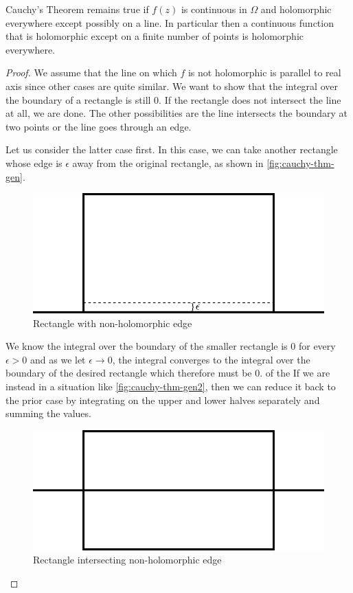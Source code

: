 \begin{corollary}\label{cor:cauchy-thm-general}
Cauchy's Theorem remains true if $f(z)$ is continuous in $\Omega$ and holomorphic everywhere except possibly on a line. In particular then a continuous function that is holomorphic except on a finite number of points is holomorphic everywhere.
\end{corollary}
\begin{proof}
    We assume that the line on which $f$ is not holomorphic is parallel to real axis since other cases are quite similar. 
    We want to show that the integral over the boundary of a rectangle is still 0. If the rectangle does not intersect the line at all, we are done. The other possibilities are the line intersects the boundary at two points or the line 
    goes through an edge. 

    Let us consider the latter case first. In this case, we can take another rectangle whose edge is $\epsilon$ away from the original rectangle, as shown in \autoref{fig:cauchy-thm-gen}. 
    \begin{figure}[h]
        \centering
        \includegraphics{Images/cauchy_thm_gen.png}
        \caption{Rectangle with non-holomorphic edge}
        \label{fig:cauchy-thm-gen}
    \end{figure}
    We know the integral over the boundary of the smaller rectangle is 0 for every $\epsilon > 0$ and as we let $\epsilon \to 0$, the integral converges to the integral over the boundary of the desired rectangle which therefore must be 0. of the If we are instead in a situation like \autoref{fig:cauchy-thm-gen2}, then we can reduce it back to the prior case by integrating on the upper and lower halves separately and summing the values.
    \begin{figure}[h]
        \centering
        \includegraphics{Images/cauchy_thm_gen2.png}
        \caption{Rectangle intersecting non-holomorphic edge}
        \label{fig:cauchy-thm-gen2}
    \end{figure}
\end{proof}
